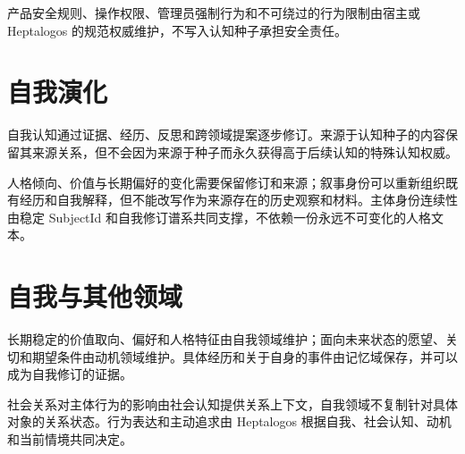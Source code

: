 产品安全规则、操作权限、管理员强制行为和不可绕过的行为限制由宿主或 Heptalogos 的规范权威维护，不写入认知种子承担安全责任。

\section{自我演化}

自我认知通过证据、经历、反思和跨领域提案逐步修订。来源于认知种子的内容保留其来源关系，但不会因为来源于种子而永久获得高于后续认知的特殊认知权威。

人格倾向、价值与长期偏好的变化需要保留修订和来源；叙事身份可以重新组织既有经历和自我解释，但不能改写作为来源存在的历史观察和材料。主体身份连续性由稳定 SubjectId 和自我修订谱系共同支撑，不依赖一份永远不可变化的人格文本。

\section{自我与其他领域}

长期稳定的价值取向、偏好和人格特征由自我领域维护；面向未来状态的愿望、关切和期望条件由动机领域维护。具体经历和关于自身的事件由记忆域保存，并可以成为自我修订的证据。

社会关系对主体行为的影响由社会认知提供关系上下文，自我领域不复制针对具体对象的关系状态。行为表达和主动追求由 Heptalogos 根据自我、社会认知、动机和当前情境共同决定。
